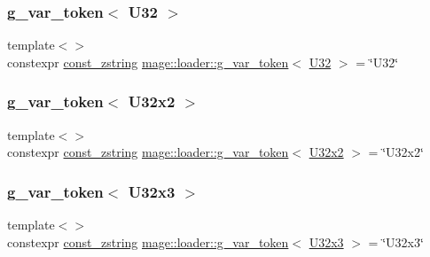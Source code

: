 \mbox{\label{namespacemage_1_1loader_a266bfa6fe8dc1de0b589e6b30d5e13ac}} 
\subsubsection{\texorpdfstring{g\+\_\+var\+\_\+token$<$ U32 $>$}{g\_var\_token< U32 >}}
{\footnotesize\ttfamily template$<$$>$ \\
constexpr \mbox{\hyperlink{namespacemage_abfd9206dc607ceb5d13ec68bf075a5c0}{const\+\_\+zstring}} \mbox{\hyperlink{namespacemage_1_1loader_af955278eb72ed57ce15bc79d4d074b3a}{mage\+::loader\+::g\+\_\+var\+\_\+token}}$<$ \mbox{\hyperlink{namespacemage_aa5d6eaabaac3cdd01873d6a3d27e90f3}{U32}} $>$ = \char`\"{}U32\char`\"{}}

\mbox{\label{namespacemage_1_1loader_a63ff7dfc7168dd564a7706d3170fd356}} 
\subsubsection{\texorpdfstring{g\+\_\+var\+\_\+token$<$ U32x2 $>$}{g\_var\_token< U32x2 >}}
{\footnotesize\ttfamily template$<$$>$ \\
constexpr \mbox{\hyperlink{namespacemage_abfd9206dc607ceb5d13ec68bf075a5c0}{const\+\_\+zstring}} \mbox{\hyperlink{namespacemage_1_1loader_af955278eb72ed57ce15bc79d4d074b3a}{mage\+::loader\+::g\+\_\+var\+\_\+token}}$<$ \mbox{\hyperlink{namespacemage_ae5e7ccf8a1785baaacf57b3a0f4324e2}{U32x2}} $>$ = \char`\"{}U32x2\char`\"{}}

\mbox{\label{namespacemage_1_1loader_a10f4eff4894004a57bcacb1863982b6c}} 
\subsubsection{\texorpdfstring{g\+\_\+var\+\_\+token$<$ U32x3 $>$}{g\_var\_token< U32x3 >}}
{\footnotesize\ttfamily template$<$$>$ \\
constexpr \mbox{\hyperlink{namespacemage_abfd9206dc607ceb5d13ec68bf075a5c0}{const\+\_\+zstring}} \mbox{\hyperlink{namespacemage_1_1loader_af955278eb72ed57ce15bc79d4d074b3a}{mage\+::loader\+::g\+\_\+var\+\_\+token}}$<$ \mbox{\hyperlink{namespacemage_a1e9348414b777b1a460dc4f295bc87fc}{U32x3}} $>$ = \char`\"{}U32x3\char`\"{}}

